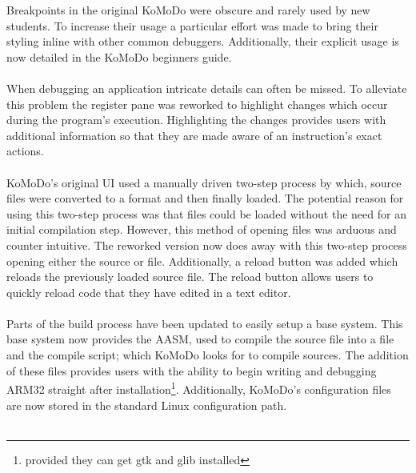   Breakpoints in the original KoMoDo were obscure and rarely used by new students. To increase their usage a particular effort was made to bring their styling inline with other common debuggers. Additionally, their explicit usage is now detailed in the KoMoDo beginners guide.\\\\
  When debugging an application intricate details can often be missed. To alleviate this problem the register pane was reworked to highlight changes which occur during the program's execution. Highlighting the changes provides users with additional information so that they are made aware of an instruction's exact actions.\\\\
  KoMoDo's original UI used a manually driven two-step process by which, source files were converted to a  format and then finally loaded. The potential reason for using this two-step process was that  files could be loaded without the need for an initial compilation step. However, this method of opening files was arduous and counter intuitive. The reworked version now does away with this two-step process opening either the source or  file. Additionally, a reload button was added which reloads the previously loaded source file. The reload button allows users to quickly reload code that they have edited in a text editor.\\\\
  Parts of the build process have been updated to easily setup a base system. This base system now provides the AASM, used to compile the source file into a  file and the compile script; which KoMoDo looks for to compile sources. The addition of these files provides users with the ability to begin writing and debugging ARM32 straight after installation\footnote{provided they can get gtk and glib installed}. Additionally, KoMoDo's configuration files are now stored in the standard Linux configuration path.\\\\
